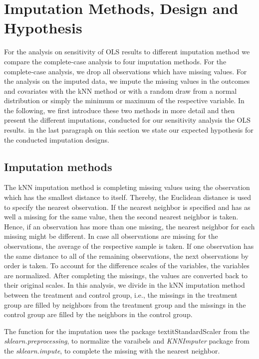 \section{Imputation Methods, Design and Hypothesis}
\label{sec:imputation_method}

For the analysis on sensitivity of \ac{OLS} results to different imputation method we compare the complete-case analysis to four imputation methods. For the complete-case analysis, we drop all observations which have missing values. For the analysis on the imputed data, we impute the missing values in the outcomes and covariates with the \ac{kNN} method or with a random draw from a normal distribution or simply the minimum or maximum of the respective variable. In the following, we first introduce these two methods in more detail and then present the different imputations, conducted for our sensitivity analysis the \ac{OLS} results. in the last paragraph on this section we state our expected hypothesis for the conducted imputation designs.

\subsection{Imputation methods}
The \ac{kNN} imputation method is completing missing values using the observation which has the smallest distance to itself. Thereby, the Euclidean distance is used to specify the nearest observation. If the nearest neighbor is specified and has as well a missing for the same value, then the second nearest neighbor is taken. Hence, if an observation has more than one missing, the nearest neighbor for each missing might be different. In case all observations are missing for the observations, the average of the respective sample is taken. If one observation has the same distance to all of the remaining observations, the next observations by order is taken. To account for the difference scales of the variables, the variables are normalized. After completing the missings, the values are converted back to their original scales. In this analysis, we divide in the \ac{kNN} imputation method between the treatment and control group, i.e., the missings in the treatment group are filled by neighbors from the treatment group and the missings in the control group are filled by the neighbors in the control group.

The function for the imputation uses the package textit{StandardScaler} from the \textit{sklearn.preprocessing}, to normalize the varaibels and \textit{KNNImputer} package from the \textit{sklearn.impute}, to complete the missing with the nearest neighbor.

